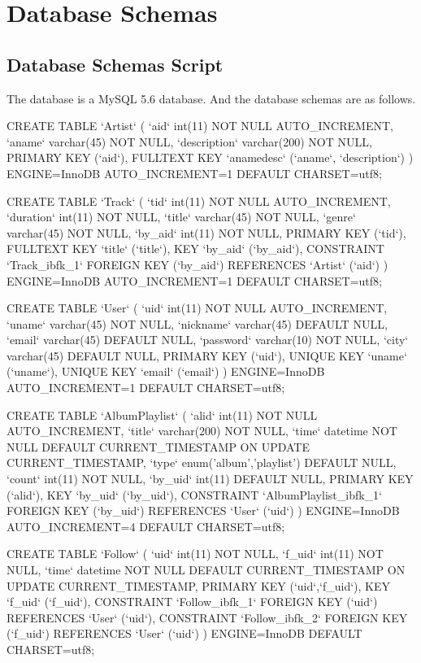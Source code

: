 \documentclass[letterpaper, 12pt]{report}
\begin{document}
	\section{Database Schemas}
	\subsection{Database Schemas Script}
	The database is a MySQL 5.6 database. And the database schemas are as follows.
	\begin{spverbatim}
	CREATE TABLE `Artist` (
	`aid` int(11) NOT NULL AUTO_INCREMENT,
	`aname` varchar(45) NOT NULL,
	`description` varchar(200) NOT NULL,
	PRIMARY KEY (`aid`),
	FULLTEXT KEY `anamedesc` (`aname`, `description`)
	) ENGINE=InnoDB AUTO_INCREMENT=1 DEFAULT CHARSET=utf8;
	
	CREATE TABLE `Track` (
	`tid` int(11) NOT NULL AUTO_INCREMENT,
	`duration` int(11) NOT NULL,
	`title` varchar(45) NOT NULL,
	`genre` varchar(45) NOT NULL,
	`by_aid` int(11) NOT NULL,
	PRIMARY KEY (`tid`),
	FULLTEXT KEY `title` (`title`),
	KEY `by_aid` (`by_aid`),
	CONSTRAINT `Track_ibfk_1` FOREIGN KEY (`by_aid`) REFERENCES `Artist` (`aid`)
	) ENGINE=InnoDB AUTO_INCREMENT=1 DEFAULT CHARSET=utf8;
	
	CREATE TABLE `User` (
	`uid` int(11) NOT NULL AUTO_INCREMENT,
	`uname` varchar(45) NOT NULL,
	`nickname` varchar(45) DEFAULT NULL,
	`email` varchar(45) DEFAULT NULL,
	`password` varchar(10) NOT NULL,
	`city` varchar(45) DEFAULT NULL,
	PRIMARY KEY (`uid`),
	UNIQUE KEY `uname` (`uname`),
	UNIQUE KEY `email` (`email`)
	) ENGINE=InnoDB AUTO_INCREMENT=1 DEFAULT CHARSET=utf8;
	
	CREATE TABLE `AlbumPlaylist` (
	`alid` int(11) NOT NULL AUTO_INCREMENT,
	`title` varchar(200) NOT NULL,
	`time` datetime NOT NULL DEFAULT CURRENT_TIMESTAMP ON UPDATE CURRENT_TIMESTAMP,
	`type` enum('album','playlist') DEFAULT NULL,
	`count` int(11) NOT NULL,
	`by_uid` int(11) DEFAULT NULL,
	PRIMARY KEY (`alid`),
	KEY `by_uid` (`by_uid`),
	CONSTRAINT `AlbumPlaylist_ibfk_1` FOREIGN KEY (`by_uid`) REFERENCES `User` (`uid`)
	) ENGINE=InnoDB AUTO_INCREMENT=4 DEFAULT CHARSET=utf8;
	
	CREATE TABLE `Follow` (
	`uid` int(11) NOT NULL,
	`f_uid` int(11) NOT NULL,
	`time` datetime NOT NULL DEFAULT CURRENT_TIMESTAMP ON UPDATE CURRENT_TIMESTAMP,
	PRIMARY KEY (`uid`,`f_uid`),
	KEY `f_uid` (`f_uid`),
	CONSTRAINT `Follow_ibfk_1` FOREIGN KEY (`uid`) REFERENCES `User` (`uid`),
	CONSTRAINT `Follow_ibfk_2` FOREIGN KEY (`f_uid`) REFERENCES `User` (`uid`)
	) ENGINE=InnoDB DEFAULT CHARSET=utf8;
	

\end{spverbatim}
\end{document}
